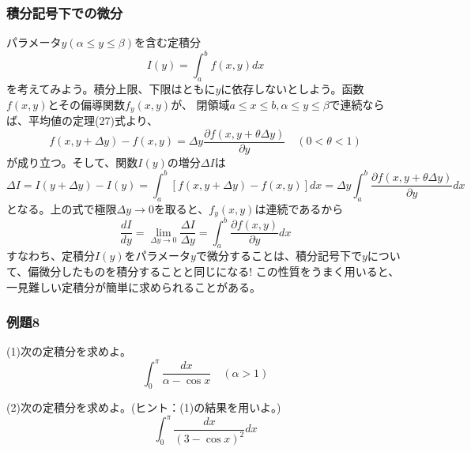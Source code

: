 \documentclass[a4j,dvipdfmx]{jsarticle}
\begin{document}
\subsubsection{積分記号下での微分}
パラメータ$y(\alpha\leq y\leq\beta)$を含む定積分
\begin{equation}
    I(y)=\int_a^b f(x,y)dx
\end{equation}
を考えてみよう。積分上限、下限はともに$y$に依存しないとしよう。函数$f(x,y)$とその偏導関数$f_y(x,y)$が、
閉領域$a\leq x\leq b,\alpha\leq y\leq \beta$で連続ならば、平均値の定理(27)式より、
\begin{equation}
    f(x,y+\Delta y)-f(x,y)=\Delta y\frac{\partial f(x,y+\theta\Delta y)}{\partial y}\quad(0<\theta<1)
\end{equation}
が成り立つ。そして、関数$I(y)$の増分$\Delta I$は
\begin{equation}
    \Delta I=I(y+\Delta y)-I(y)=\int_a^b[f(x,y+\Delta y)-f(x,y)]dx=\Delta y\int_a^b\frac{\partial f(x,y+\theta\Delta y)}{\partial y}dx
\end{equation}
となる。上の式で極限$\Delta y\to 0$を取ると、$f_y(x,y)$は連続であるから
\begin{equation}
    \frac{dI}{dy}=\lim_{\Delta y\to 0}\frac{\Delta I}{\Delta y}=\int_a^b\frac{\partial f(x,y)}{\partial y}dx
\end{equation}
すなわち、定積分$I(y)$をパラメータ$y$で微分することは、積分記号下で$y$について、偏微分したものを積分することと同じになる!
この性質をうまく用いると、一見難しい定積分が簡単に求められることがある。
\subsubsection*{例題8}
(1)次の定積分を求めよ。
\begin{equation*}
    \int_0^\pi\frac{dx}{\alpha-\cos x}\quad(\alpha>1)
\end{equation*}

(2)次の定積分を求めよ。(ヒント：(1)の結果を用いよ。)
\begin{equation*}
    \int_0^\pi\frac{dx}{(3-\cos x)^2}dx
\end{equation*}
\end{document}
